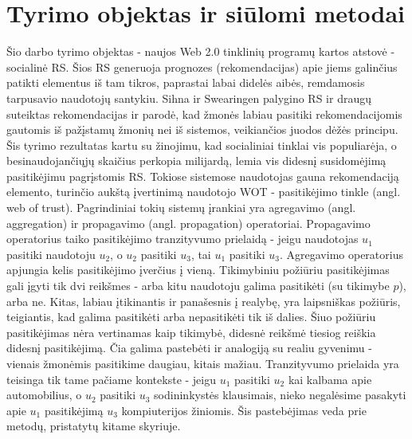 \documentclass{VUMIFInfMagistrinis}
\begin{document}
\section{Tyrimo objektas ir siūlomi metodai}
\indent
Šio darbo tyrimo objektas - naujos Web 2.0 tinklinių programų kartos atstovė - socialinė RS. Šios RS generuoja prognozes (rekomendacijas) apie jiems galinčius patikti elementus iš tam tikros, paprastai labai didelės aibės, remdamosis tarpusavio naudotojų santykiu. Sihna ir Swearingen \cite{19} palygino RS ir draugų suteiktas rekomendacijas ir parodė, kad žmonės labiau pasitiki rekomendacijomis gautomis iš pažįstamų žmonių nei iš sistemos, veikiančios juodos dėžės principu. Šis tyrimo rezultatas kartu su žinojimu, kad socialiniai tinklai vis populiarėja, o besinaudojančiųjų skaičius perkopia milijardą, lemia vis didesnį susidomėjimą pasitikėjimu pagrįstomis RS.
\newline
\indent 
Tokiose sistemose naudotojas gauna rekomendaciją elemento, turinčio aukštą įvertinimą naudotojo WOT - pasitikėjimo tinkle (angl. web of trust). Pagrindiniai tokių sistemų įrankiai yra agregavimo (angl. aggregation) ir propagavimo (angl. propagation) operatoriai. Propagavimo operatorius taiko pasitikėjimo tranzityvumo prielaidą - jeigu naudotojas $u_1$ pasitiki naudotoju $u_2$, o $u_2$ pasitiki $u_3$, tai $u_1$ pasitiki $u_3$. Agregavimo operatorius apjungia kelis pasitikėjimo įverčius į vieną.
\newline
\indent
Tikimybiniu požiūriu pasitikėjimas gali įgyti tik dvi reikšmes - arba kitu naudotoju galima pasitikėti (su tikimybe $p$), arba ne. Kitas, labiau įtikinantis ir panašesnis į realybę, yra laipsniškas požiūris, teigiantis, kad galima pasitikėti arba nepasitikėti tik iš dalies. Šiuo požiūriu pasitikėjimas nėra vertinamas kaip tikimybė, didesnė reikšmė tiesiog reiškia didesnį pasitikėjimą. Čia galima pastebėti ir analogiją su realiu gyvenimu - vienais žmonėmis pasitikime daugiau, kitais mažiau.
\newline
\indent
Tranzityvumo prielaida yra teisinga tik tame pačiame kontekste - jeigu $u_1$ pasitiki $u_2$ kai kalbama apie automobilius, o $u_2$ pasitiki $u_3$ sodininkystės klausimais, nieko negalėsime pasakyti apie $u_1$ pasitikėjimą $u_3$ kompiuterijos žiniomis. Šis pastebėjimas veda prie metodų, pristatytų kitame skyriuje.
\end{document}
